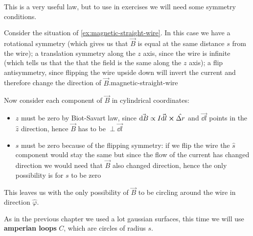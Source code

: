\documentclass[12pt]{extarticle}
\begin{document}
This is a very useful law, but to use in exercises we will need some symmetry conditions.

Consider the situation of \cref{ex:magnetic-straight-wire}.
In this case we have a rotational symmetry (which gives us that $\vec B$ is equal at the same distance $s$ from the wire);
a translation symmetry along the $z$ axis, since the wire is infinite (which tells us that the that the field is the same along the $z$ axis);
a flip antisymmetry, since flipping the wire upside down will invert the current and therefore change the direction of $\vec B$.magnetic-straight-wire

Now consider each component of $\vec B$ in cylindrical coordinates:
\begin{itemize}
	\item
	      $z$ must be zero by Biot-Savart law, since $\vec{\dd B} \propto I \vec{\dd l} \cross \hat{\Delta r}$
	      and $\vec{\dd l}$ points in the $\hat z$ direction, hence $\vec B$ has to be $\perp \vec{\dd l}$
	\item
	      $s$ must be zero because of the flipping symmetry: if we flip the wire the $\hat s$ component would stay the same
	      but since the flow of the current has changed direction we would need that $\vec B$ also changed direction,
	      hence the only possibility is for $s$ to be zero
\end{itemize}
This leaves us with the only possibility of $\vec B$ to be circling around the wire in direction $\hat \varphi$.

As in the previous chapter we used a lot gaussian surfaces, this time we will use \textbf{amperian loops} $C$,
which are circles of radius $s$.
\end{document}
